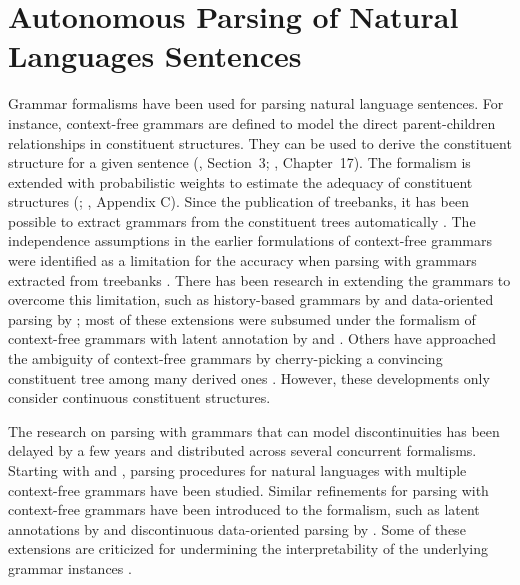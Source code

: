 \documentclass[../document.tex]{subfiles}
\begin{document}
    \section*{Autonomous Parsing of Natural Languages Sentences}
    Grammar formalisms have been used for parsing natural language sentences.
        For instance, context-free grammars are defined to model the direct parent-children relationships in constituent structures.
        They can be used to derive the constituent structure for a given sentence (\citealp{Cho56}, Section~3; \citealp{Jur23}, Chapter~17).
        The formalism is extended with probabilistic weights to estimate the adequacy of constituent structures (\citealp{Sup72}; \citealp{Jur23}, Appendix C).
    Since the publication of treebanks, it has been possible to extract grammars from the constituent trees automatically \citep{Cha96}.
    The independence assumptions in the earlier formulations of context-free grammars were identified as a limitation for the accuracy when parsing with grammars extracted from treebanks \citep[e.g.\@][Section~1.1]{collins2001convolution}.
    There has been research in extending the grammars to overcome this limitation, such as history-based grammars by \citet{Black94} and data-oriented parsing by \citet{Bod92}; most of these extensions were subsumed under the formalism of context-free grammars with latent annotation by \citet{Mat05} and \citet{Petrov06}.
    Others have approached the ambiguity of context-free grammars by cherry-picking a convincing constituent tree among many derived ones \citep{Col00}.
    However, these developments only consider continuous constituent structures.
    
    The research on parsing with grammars that can model discontinuities has been delayed by a few years and distributed across several concurrent formalisms.
    Starting with \citet{MaierSogaard08} and \citet{Kal10}, parsing procedures for natural languages with multiple context-free grammars have been studied.
    Similar refinements for parsing with context-free grammars have been introduced to the formalism, such as latent annotations by \citet{Geb20} and discontinuous data-oriented parsing by \citet{Cra11}.
    Some of these extensions are criticized for undermining the interpretability of the underlying grammar instances \citep[Chapter 9]{Geb20}.
\end{document}
